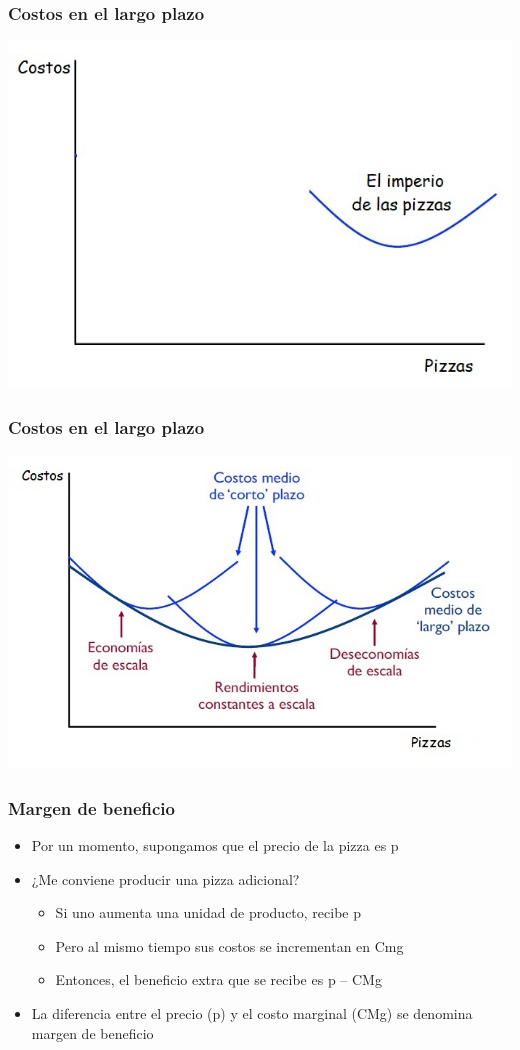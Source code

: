 \documentclass{beamer}
\begin{document}
\begin{frame}
\frametitle{ Costos en el largo plazo}
\centering
\includegraphics[scale=0.6]{Figures/Tema_06.26.jpg}
\end{frame}

\begin{frame}
\frametitle{ Costos en el largo plazo}
\centering
\includegraphics[scale=0.6]{Figures/Tema_06.25_costos4.jpg}
\end{frame}

\begin{frame}
\frametitle{ Margen de beneficio}
\begin{itemize}
    \item Por un momento, supongamos que el precio de la pizza es p
        \item ¿Me conviene producir una pizza adicional?     
    \begin{itemize}
        \item Si uno aumenta una unidad de producto, recibe p
        \item Pero al mismo tiempo sus costos se incrementan en Cmg
        \item Entonces, el beneficio extra que se recibe es p – CMg
        \end{itemize}
    \item La diferencia entre el precio (p) y el costo marginal (CMg) se denomina margen de beneficio
\end{itemize}
\end{frame}
\end{document}

